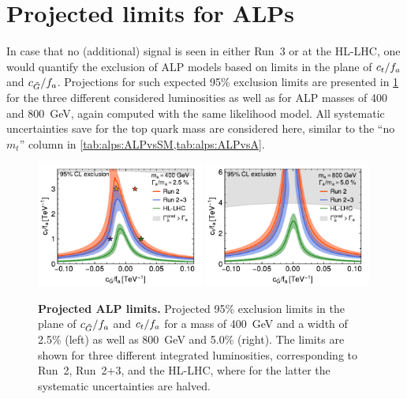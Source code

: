 \section{Projected limits for ALPs}
\label{sec:alps:limits}

In case that no (additional) signal is seen in either Run~3 or at the HL-LHC, one would quantify the exclusion of ALP models based on limits in the plane of $c_t/f_a$ and $c_{\tilde{G}}/f_a$. Projections for such expected 95\% exclusion limits are presented in \cref{fig:alps:limits} for the three different considered luminosities as well as for ALP masses of 400 and 800~GeV, again computed with the same likelihood model. All systematic uncertainties save for the top quark mass are considered here, similar to the ``no $m_t$'' column in \cref{tab:alps:ALPvsSM,tab:alps:ALPvsA}.

\begin{figure}[t]
    \centering
    \includegraphics[width=0.49\textwidth]{figures/alps/limits_m400_w2p5_notmass_small_width.pdf}
    \hfill
    \includegraphics[width=0.49\textwidth]{figures/alps/limits_m800_w5p0_notmass_small.pdf}
    \caption{
        \textbf{Projected ALP limits.} Projected 95\% exclusion limits in the plane of $c_{\tilde{G}}/f_a$ and $c_t/f_a$ for a mass of \SI{400}{\GeV} and a width of 2.5\% (left) as well as \SI{800}{\GeV} and 5.0\% (right). The limits are shown for three different integrated luminosities, corresponding to Run~2, Run~2+3, and the HL-LHC, where for the latter the systematic uncertainties are halved.
    }
    \label{fig:alps:limits}
\end{figure}

